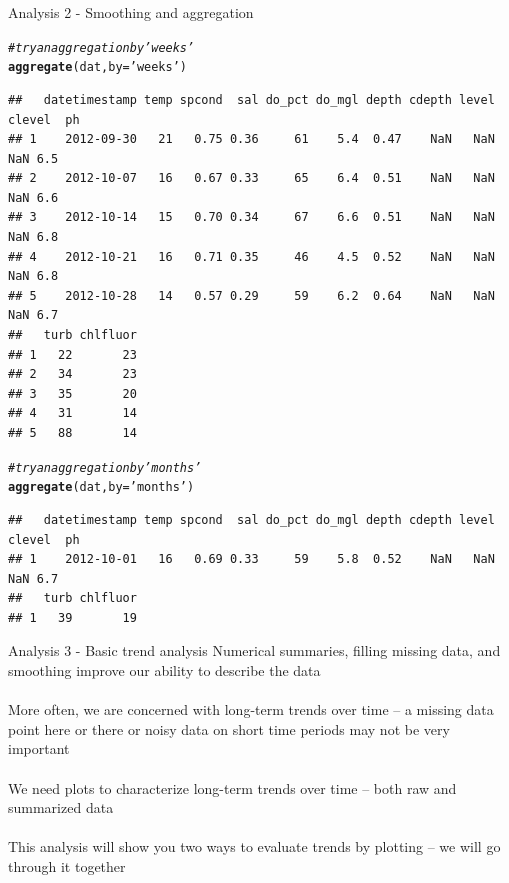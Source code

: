 \documentclass[xcolor=svgnames]{beamer}\usepackage[]{graphicx}\usepackage[]{color}
\makeatletter
\newcommand{\hlstr}[1]{\textcolor[rgb]{0.192,0.494,0.8}{#1}}%
\newcommand{\hlcom}[1]{\textcolor[rgb]{0.678,0.584,0.686}{\textit{#1}}}%
\newcommand{\hlstd}[1]{\textcolor[rgb]{0.345,0.345,0.345}{#1}}%
\newcommand{\hlkwc}[1]{\textcolor[rgb]{0.333,0.667,0.333}{#1}}%
\newcommand{\hlkwd}[1]{\textcolor[rgb]{0.737,0.353,0.396}{\textbf{#1}}}%
\newenvironment{kframe}{%
 \def\at@end@of@kframe{}%
 \ifinner\ifhmode%
  \def\at@end@of@kframe{\end{minipage}}%
  \begin{minipage}{\columnwidth}%
 \fi\fi%
 \def\FrameCommand##1{\hskip\@totalleftmargin \hskip-\fboxsep
 \colorbox{shadecolor}{##1}\hskip-\fboxsep
     \hskip-\linewidth \hskip-\@totalleftmargin \hskip\columnwidth}%
 \MakeFramed {\advance\hsize-\width
   \@totalleftmargin\z@ \linewidth\hsize
   \@setminipage}}%
 {\par\unskip\endMakeFramed%
 \at@end@of@kframe}
\newenvironment{knitrout}{}{} %
\makeatother
\begin{document}
\begin{frame}[containsverbatim]{Analysis 2 - Smoothing and aggregation}
\begin{knitrout}\scriptsize
{}\color{fgcolor}\begin{kframe}
\begin{alltt}
\hlcom{# try an aggregation by 'weeks'}
\hlkwd{aggregate}\hlstd{(dat,} \hlkwc{by} \hlstd{=} \hlstr{'weeks'}\hlstd{)}
\end{alltt}
\begin{verbatim}
##   datetimestamp temp spcond  sal do_pct do_mgl depth cdepth level clevel  ph
## 1    2012-09-30   21   0.75 0.36     61    5.4  0.47    NaN   NaN    NaN 6.5
## 2    2012-10-07   16   0.67 0.33     65    6.4  0.51    NaN   NaN    NaN 6.6
## 3    2012-10-14   15   0.70 0.34     67    6.6  0.51    NaN   NaN    NaN 6.8
## 4    2012-10-21   16   0.71 0.35     46    4.5  0.52    NaN   NaN    NaN 6.8
## 5    2012-10-28   14   0.57 0.29     59    6.2  0.64    NaN   NaN    NaN 6.7
##   turb chlfluor
## 1   22       23
## 2   34       23
## 3   35       20
## 4   31       14
## 5   88       14
\end{verbatim}
\begin{alltt}
\hlcom{# try an aggregation by 'months'}
\hlkwd{aggregate}\hlstd{(dat,} \hlkwc{by} \hlstd{=} \hlstr{'months'}\hlstd{)}
\end{alltt}
\begin{verbatim}
##   datetimestamp temp spcond  sal do_pct do_mgl depth cdepth level clevel  ph
## 1    2012-10-01   16   0.69 0.33     59    5.8  0.52    NaN   NaN    NaN 6.7
##   turb chlfluor
## 1   39       19
\end{verbatim}
\end{kframe}
\end{knitrout}
\end{frame}

\begin{frame}[containsverbatim]{Analysis 3 - Basic trend analysis}
Numerical summaries, filling missing data, and smoothing improve our ability to describe the data \\~\\
More often, we are concerned with \alert{long-term trends} over time -- a missing data point here or there or noisy data on short time periods may not be very important \\~\\
We need \alert{plots} to characterize long-term trends over time -- both \alert{raw} and \alert{summarized} data \\~\\
This analysis will show you two ways to evaluate trends by plotting -- we will go through it together
\end{frame}
\end{document}

